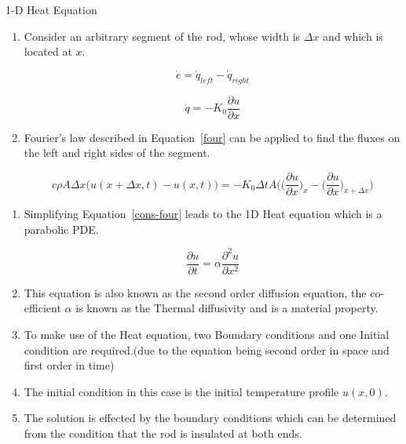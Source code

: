 \documentclass[10pt,compress]{beamer}
\begin{document}
\begin{frame}{1-D Heat Equation}
\begin{enumerate}
\item Consider an arbitrary segment of the rod, whose width is $\Delta x$ and which is located at $x$.
\begin{center}
\begin{equation} \label{econserve}
	\dot{e}= \dot{q}_{left} - \dot{q}_{right}
\end{equation}
\end{center}
\begin{center}
\begin{equation} \label{four}
\dot{q} = -K_{0} \frac{\partial u}{\partial x}
\end{equation}
\end{center}
\item Fourier's law described in Equation~\ref{four} can be applied to find the fluxes on the left and right sides of the segment.
\begin{center}
\begin{equation} \label{cons-four}
c \rho A \Delta x \bigg(u(x+ \Delta x,t)-u(x,t) \bigg) = -K_{0} \Delta t A \bigg(  \Big( \frac{\partial u}{\partial x} \Big)_{x}-\Big( \frac{\partial u}{\partial x}\Big)_{x+ \Delta x} \bigg )
\end{equation}
\end{center}
\end{enumerate}
\end{frame}

\begin{frame}
\begin{enumerate}
\item Simplifying Equation~\ref{cons-four} leads to the 1D Heat equation which is a parabolic PDE.
\begin{center}
\begin{equation} \label{1diff}
\frac{\partial u}{\partial t}=\alpha \frac{\partial^{2} u}{\partial x^{2}}
\end{equation}
\end{center}
\item This equation is also known as the second order diffusion equation, the co-efficient $\alpha$ is known as the Thermal diffusivity and is a material property.
\item To make use of the Heat equation, two Boundary conditions and one Initial condition are required.(due to the equation being second order in space and first order in time)
\item The initial condition in this case is the initial temperature profile $u(x,0)$.
\item The solution is effected by the boundary conditions which can be determined from the condition that the rod is insulated at both ends.
\end{enumerate}
\end{frame}
\end{document}

